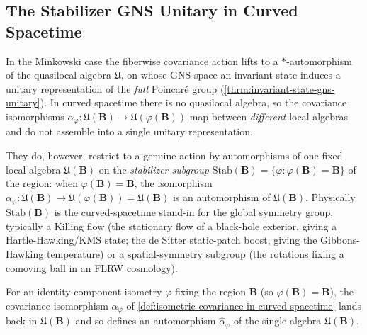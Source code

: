\subsection{The Stabilizer GNS Unitary in Curved Spacetime}

In the Minkowski case the fiberwise covariance action lifts to a $*$-automorphism of the quasilocal algebra $\mathfrak{U}$, on whose GNS space an invariant state induces a unitary representation of the \emph{full} Poincar\'e group (\ref{thrm:invariant-state-gns-unitary}). In curved spacetime there is no quasilocal algebra, so the covariance isomorphisms $\alpha_\varphi : \mathfrak{U}(\mathbf{B}) \to \mathfrak{U}(\varphi(\mathbf{B}))$ map between \emph{different} local algebras and do not assemble into a single unitary representation.

They do, however, restrict to a genuine action by automorphisms of one fixed local algebra $\mathfrak{U}(\mathbf{B})$ on the \emph{stabilizer subgroup} $\mathrm{Stab}(\mathbf{B}) = \{\varphi : \varphi(\mathbf{B}) = \mathbf{B}\}$ of the region: when $\varphi(\mathbf{B}) = \mathbf{B}$, the isomorphism $\alpha_\varphi : \mathfrak{U}(\mathbf{B}) \to \mathfrak{U}(\varphi(\mathbf{B})) = \mathfrak{U}(\mathbf{B})$ is an automorphism of $\mathfrak{U}(\mathbf{B})$. Physically $\mathrm{Stab}(\mathbf{B})$ is the curved-spacetime stand-in for the global symmetry group, typically a Killing flow (the stationary flow of a black-hole exterior, giving a Hartle-Hawking/KMS state; the de Sitter static-patch boost, giving the Gibbons-Hawking temperature) or a spatial-symmetry subgroup (the rotations fixing a comoving ball in an FLRW cosmology).

\begin{definition}
    \label{def:stabilizer-action-in-curved-spacetime}
    \leanok
    For an identity-component isometry $\varphi$ fixing the region $\mathbf{B}$ (so $\varphi(\mathbf{B}) = \mathbf{B}$), the covariance isomorphism $\alpha_\varphi$ of \ref{def:isometric-covariance-in-curved-spacetime} lands back in $\mathfrak{U}(\mathbf{B})$ and so defines an automorphism $\hat\alpha_\varphi$ of the single algebra $\mathfrak{U}(\mathbf{B})$.
\end{definition}

